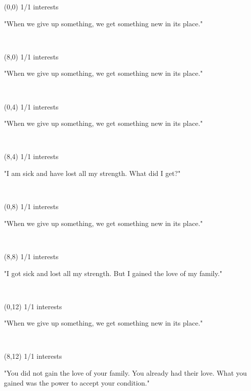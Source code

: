 \documentclass[a4paper]{article}
\newcommand{\mycard}[5]{%
	\vspace{0.1cm}
	\small #1 #2
	\par
	\parbox[t][6.7cm][c]{9.5cm}{%
	\hspace{0.1cm} \Large#3\\
	\normalsize#4 #5
	}
}
\begin{document}
\selectfont

\begin{textblock}{8}(0,0)
\mycard{1/1}{interests}{\parbox{9.0cm}{
"When we give up something, we get something new in its place."
}}{}{} 
\end{textblock}

\begin{textblock}{8}(8,0)
\mycard{1/1}{interests}{\parbox{9.0cm}{
"When we give up something, we get something new in its place."
}}{}{} 
\end{textblock}

\begin{textblock}{8}(0,4)
\mycard{1/1}{interests}{\parbox{9.0cm}{
"When we give up something, we get something new in its place."
}}{}{} 
\end{textblock}

\begin{textblock}{8}(8,4)
\mycard{1/1}{interests}{\parbox{9.0cm}{
"I am sick and have lost all my strength. What did I get?"
}}{}{} 
\end{textblock}

\begin{textblock}{8}(0,8)
\mycard{1/1}{interests}{\parbox{9.0cm}{
"When we give up something, we get something new in its place."
}}{}{} 
\end{textblock}

\begin{textblock}{8}(8,8)
\mycard{1/1}{interests}{\parbox{9.0cm}{
"I got sick and lost all my strength. But I gained the love of my family."
}}{}{} 
\end{textblock}

\begin{textblock}{8}(0,12)
\mycard{1/1}{interests}{\parbox{9.0cm}{
"When we give up something, we get something new in its place."
}}{}{} 
\end{textblock}

\begin{textblock}{8}(8,12)
\mycard{1/1}{interests}{\parbox{9.0cm}{
"You did not gain the love of your family. You already had their love. What you gained was the power to accept your condition."
}}{}{} 
\end{textblock}
\end{document}
